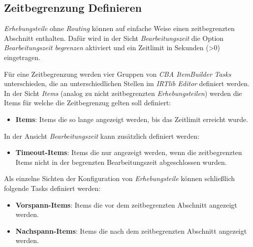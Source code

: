 \documentclass[
  letterpaper,
  DIV=11]{scrreprt}
\providecommand{\tightlist}{%
  \setlength{\itemsep}{0pt}\setlength{\parskip}{0pt}}\usepackage{longtable,booktabs,array}
\begin{document}
\begin{tcolorbox}[enhanced jigsaw, colbacktitle=quarto-callout-tip-color!10!white, coltitle=black, colframe=quarto-callout-tip-color-frame, leftrule=.75mm, breakable, opacitybacktitle=0.6, toprule=.15mm, title=\textcolor{quarto-callout-tip-color}{\faLightbulb}\hspace{0.5em}{Eingebettete Programmhilfe}, colback=white, titlerule=0mm, arc=.35mm, bottomtitle=1mm, toptitle=1mm, rightrule=.15mm, bottomrule=.15mm, left=2mm, opacityback=0]

\hypertarget{zeitbegrenzung-definieren-1}{%
\subsection{Zeitbegrenzung
Definieren}\label{zeitbegrenzung-definieren-1}}

\emph{Erhebungsteile} ohne \emph{Routing} können auf einfache Weise
einen zeitbegrenzten Abschnitt enthalten. Dafür wird in der Sicht
\emph{Bearbeitungszeit} die Option \emph{Bearbeitungszeit begrenzen}
aktiviert und ein Zeitlimit in Sekunden (\textgreater0) eingetragen.

Für eine Zeitbegrenzung werden vier Gruppen von \emph{CBA ItemBuilder}
\emph{Tasks} unterschieden, die an unterschiedlichen Stellen im
\emph{IRTlib Editor} definiert werden. In der Sicht \emph{Items} (analog
zu nicht zeitbegrenzten \emph{Erhebungsteilen}) werden die Items für
welche die Zeitbegrenzug gelten soll definiert:

\begin{itemize}
\tightlist
\item
  \textbf{Items}: Items die so lange angezeigt werden, bis das Zeitlimit
  erreicht wurde.
\end{itemize}

In der Ansicht \emph{Bearbeitungszeit} kann zusätzlich definiert werden:

\begin{itemize}
\tightlist
\item
  \textbf{Timeout-Items}: Items die nur angezeigt werden, wenn die
  zeitbegrenzten Items nicht in der begrenzten Bearbeitungszeit
  abgeschlossen wurden.
\end{itemize}

Als einzelne Sichten der Konfiguration von \emph{Erhebungsteile} können
schließlich folgende Tasks definiert werden:

\begin{itemize}
\tightlist
\item
  \textbf{Vorspann-Items}: Items die vor dem zeitbegrenzten Abschnitt
  angezeigt werden.
\item
  \textbf{Nachspann-Items}: Items die nach dem zeitbegrenzten Abschnitt
  angezeigt werden.
\end{itemize}


\end{tcolorbox}
\end{document}
